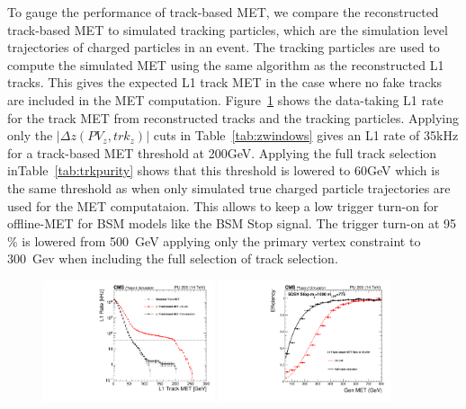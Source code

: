 To gauge the performance of track-based MET, we compare the reconstructed track-based MET to simulated tracking particles, which are the simulation level trajectories of charged particles in an event. The tracking particles are used to compute the simulated MET using the same algorithm as the reconstructed L1 tracks. This gives the expected L1 track MET in the case where no fake tracks are included in the MET computation. Figure~\ref{fig:TkMETPerformance} shows the data-taking L1 rate for the track MET from reconstructed tracks and the tracking particles. Applying only the $\vert \Delta z\left(PV_{z}, trk_{z}\right) \vert$ cuts in Table~\ref{tab:zwindows} gives an L1 rate of 35kHz for a track-based MET threshold at 200GeV. Applying the full track selection inTable~\ref{tab:trkpurity} shows that this threshold is lowered to 60GeV which is the same threshold as when only simulated true charged particle trajectories are used for the MET computataion. 
This allows to keep a low trigger turn-on for offline-MET for BSM models like the BSM Stop signal. The trigger turn-on at 95$\%$ is lowered from 500~GeV applying only the primary vertex constraint to 300~Gev when including the full selection of track selection. 
\begin{figure}
\includegraphics[width=0.45\textwidth ]{MinBiasTKMETRatePlot.pdf}
\includegraphics[width=0.45\textwidth ]{turnonMET.pdf}
\caption{}
\label{fig:TkMETPerformance}
\end{figure}





